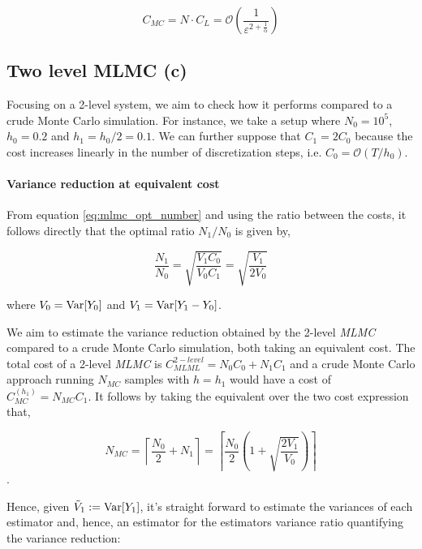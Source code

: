 \begin{equation}\label{eq:cost_mc}
C_{MC} = N \cdot C_L = \mathcal{O}\left( \frac{1}{\varepsilon^{2+\frac{1}{\alpha}}} \right)
\end{equation}

\subsection{Two level MLMC (c)}

Focusing on a 2-level system, we aim to check how it performs compared to a crude Monte Carlo simulation. For instance, we take a setup where $N_0 = 10^5$, $h_0 = 0.2$ and $h_1 = h_0 / 2 = 0.1$. We can further suppose that $C_1 = 2 C_0$ because the cost increases linearly in the number of discretization steps, i.e. $C_0 = \mathcal{O}(T / h_0)$.

\paragraph{Variance reduction at equivalent cost}
From equation \ref{eq:mlmc_opt_number} and using the ratio between the costs, it follows directly that the optimal ratio $N_1 / N_0$ is given by,

\begin{equation}\label{eq:two_lev_ratio}
\frac{N_1}{N_0} = \sqrt{\frac{V_1 C_0}{V_0 C_1}} = \sqrt{\frac{V_1}{2 V_0}}
\end{equation}

where $V_0 = \text{Var}[Y_0]$ and $V_1 = \text{Var}[Y_1 - Y_0]$.

We aim to estimate the variance reduction obtained by the 2-level \textit{MLMC} compared to a crude Monte Carlo simulation, both taking an equivalent cost.
The total cost of a 2-level \textit{MLMC} is $C_{MLML}^{2-level} = N_0 C_0 + N_1 C_1$ and
a crude Monte Carlo approach running $N_{MC}$ samples with $h = h_1$ would have a cost of $C_{MC}^{(h_1)} = N_{MC} C_1$. It follows by taking the equivalent over the two cost expression that,

\begin{equation}\label{eq:same_cost}
N_{MC} = \left\lceil \frac{N_0}{2} + N_1 \right\rceil = \left\lceil \frac{N_0}{2} \left( 1 + \sqrt{\frac{2V_1}{V_0}} \right) \right\rceil
\end{equation}.

Hence, given $\tilde{V}_1 := \text{Var}[Y_1]$, it's straight forward to estimate the variances of each estimator and, hence, an estimator for the estimators variance ratio quantifying the variance reduction:

